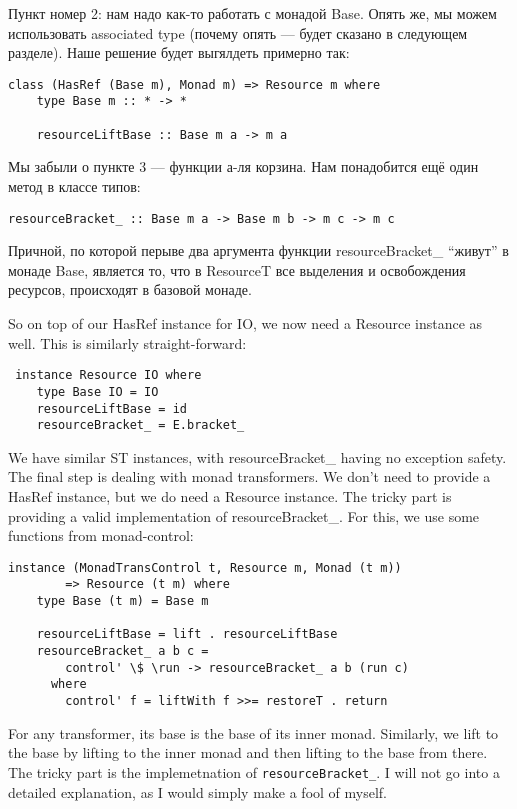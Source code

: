 Пункт номер 2: нам надо как-то работать с монадой Base. Опять же, мы можем
использовать 
associated type (почему опять --- будет сказано в следующем разделе). Наше решение будет
выгялдеть примерно так:
\begin{lstlisting}
class (HasRef (Base m), Monad m) => Resource m where
    type Base m :: * -> *

    resourceLiftBase :: Base m a -> m a 
\end{lstlisting}
Мы забыли о пункте 3 --- функции а-ля корзина. Нам понадобится ещё один метод в классе
типов:
\begin{lstlisting}
resourceBracket_ :: Base m a -> Base m b -> m c -> m c 
\end{lstlisting}
Причной, по которой перыве два аргумента функции resourceBracket\_ ``живут'' в монаде
Base,
является то, что в ResourceT все выделения и освобождения ресурсов, происходят в базовой
 монаде.

So on top of our HasRef instance for IO, we now need a
Resource instance as well. This is similarly straight-forward:
\begin{lstlisting}
 instance Resource IO where
    type Base IO = IO
    resourceLiftBase = id
    resourceBracket_ = E.bracket_
\end{lstlisting}

We have similar ST instances, with resourceBracket\_ having no
exception safety. The final step is dealing with monad transformers. We don't need to
provide a
HasRef instance, but we do need a Resource instance. The
tricky part is providing a valid implementation of resourceBracket\_. For this,
we use some functions from monad-control:

\begin{lstlisting}
instance (MonadTransControl t, Resource m, Monad (t m))
        => Resource (t m) where
    type Base (t m) = Base m

    resourceLiftBase = lift . resourceLiftBase
    resourceBracket_ a b c =
        control' \$ \run -> resourceBracket_ a b (run c)
      where
        control' f = liftWith f >>= restoreT . return 
\end{lstlisting}
For any transformer, its base is the base of its inner monad. Similarly, we lift to the
base by
lifting to the inner monad and then lifting to the base from there. The tricky part is the
implemetnation of \verb=resourceBracket_=. I will not go into a detailed explanation,
as I would simply make a fool of myself.

